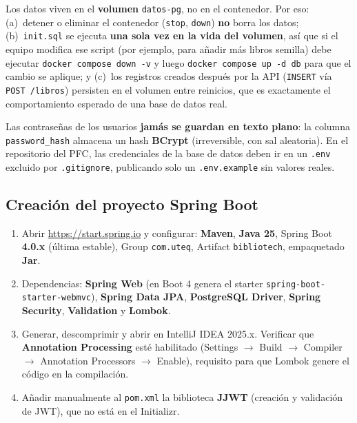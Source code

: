\documentclass[11pt,a4paper]{article}
\begin{document}
\begin{cajanota}
Los datos viven en el \textbf{volumen} \texttt{datos-pg}, no en el contenedor. Por eso: (a)~detener o eliminar el contenedor (\texttt{stop}, \texttt{down}) \textbf{no} borra los datos; (b)~\texttt{init.sql} se ejecuta \textbf{una sola vez en la vida del volumen}, así que si el equipo modifica ese script (por ejemplo, para añadir más libros semilla) debe ejecutar \texttt{docker compose down -v} y luego \texttt{docker compose up -d db} para que el cambio se aplique; y (c)~los registros creados después por la API (\texttt{INSERT} vía \texttt{POST /libros}) persisten en el volumen entre reinicios, que es exactamente el comportamiento esperado de una base de datos real.
\end{cajanota}

\begin{cajaalerta}
Las contraseñas de los usuarios \textbf{jamás se guardan en texto plano}: la columna \texttt{password\_hash} almacena un hash \textbf{BCrypt} (irreversible, con sal aleatoria). En el repositorio del PFC, las credenciales de la base de datos deben ir en un \texttt{.env} excluido por \texttt{.gitignore}, publicando solo un \texttt{.env.example} sin valores reales.
\end{cajaalerta}

\subsection{Creación del proyecto Spring Boot}

\begin{cajapaso}
\begin{enumerate}
  \item Abrir \url{https://start.spring.io} y configurar: \textbf{Maven}, \textbf{Java 25}, Spring Boot \textbf{4.0.x} (última estable), Group \texttt{com.uteq}, Artifact \texttt{bibliotech}, empaquetado \textbf{Jar}.
  \item Dependencias: \textbf{Spring Web} (en Boot 4 genera el starter \texttt{spring-boot-starter-webmvc}), \textbf{Spring Data JPA}, \textbf{PostgreSQL Driver}, \textbf{Spring Security}, \textbf{Validation} y \textbf{Lombok}.
  \item Generar, descomprimir y abrir en IntelliJ IDEA 2025.x. Verificar que \textbf{Annotation Processing} esté habilitado (Settings $\rightarrow$ Build $\rightarrow$ Compiler $\rightarrow$ Annotation Processors $\rightarrow$ Enable), requisito para que Lombok genere el código en la compilación.
  \item Añadir manualmente al \texttt{pom.xml} la biblioteca \textbf{JJWT} (creación y validación de JWT), que no está en el Initializr.
\end{enumerate}
\end{cajapaso}
\end{document}
